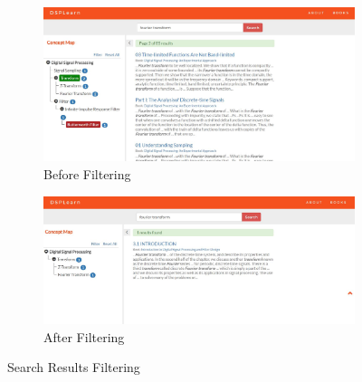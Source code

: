 \begin{figure}[!htbp]
\centering
 
  \begin{subfigure}{\textwidth}
  \centering
  \includegraphics[width=\linewidth]{system_demonstration/demo_result_filter_before.jpg}
  \caption{Before Filtering}
  \label{fig:sfig:result_filter_before}
  \end{subfigure}
  
  \begin{subfigure}{\textwidth}
  \centering
  \includegraphics[width=\linewidth]{system_demonstration/demo_result_filter_after.jpg}
  \caption{After Filtering}
  \label{fig:sfig:result_filter_after}
  \end{subfigure}
 
\caption{Search Results Filtering}
\label{fig:result_filter}
\end{figure}


